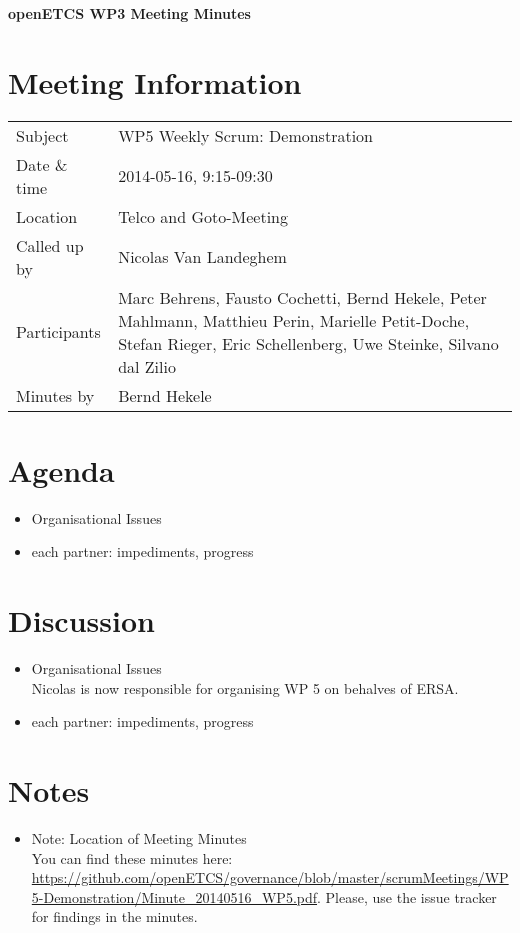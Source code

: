 \documentclass[a4paper, 11pt]{article}
\begin{document}
{\begin{center}\huge\bf openETCS WP3 Meeting Minutes\end{center}}
\section{Meeting Information}

\renewcommand{\arraystretch}{1.5}
\begin{supertabular}{m{.2\textwidth}m{.8\textwidth}}
Subject & WP5 Weekly Scrum: Demonstration\\
Date \& time & 2014-05-16, 9:15-09:30\\
Location & Telco and Goto-Meeting\\
Called up by & Nicolas Van Landeghem\\
Participants &
Marc Behrens,
Fausto Cochetti,
Bernd Hekele,
Peter Mahlmann,
Matthieu Perin,
Marielle Petit-Doche,
Stefan Rieger,
Eric Schellenberg,
Uwe Steinke,
Silvano dal Zilio
\\

Minutes by & Bernd Hekele\\
\end{supertabular}
\renewcommand{\arraystretch}{1.0}


\section{{Agenda}}
\begin{itemize}
\item Organisational Issues
\item each partner: impediments, progress
\end{itemize}

\section{Discussion}
\begin{itemize}
\item Organisational Issues\\
Nicolas is now responsible for organising WP 5 on behalves of ERSA.
\item each partner: impediments, progress

\end{itemize}

\section{Notes}
\begin{itemize}

\item Note: Location of Meeting Minutes\\
You can find these minutes here: \url{https://github.com/openETCS/governance/blob/master/scrumMeetings/WP5-Demonstration/Minute_20140516_WP5.pdf}. Please, use the issue tracker for findings in the minutes.

\end{itemize}
\end{document}
